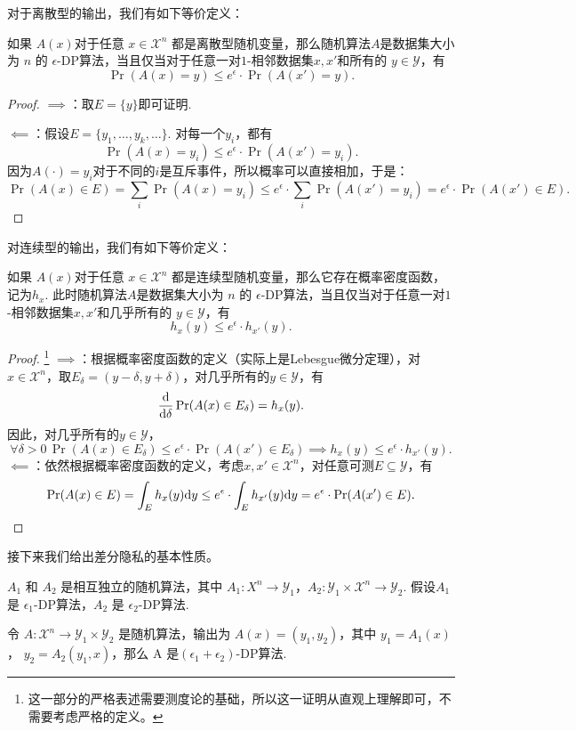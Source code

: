 对于离散型的输出，我们有如下等价定义：
\begin{proposition}\label{prop:discrete-dp}
    如果 $A(x)$对于任意 $x \in \mathcal X^n$ 都是离散型随机变量，那么随机算法$A$是数据集大小为 $n$ 的 $\epsilon$-DP算法，当且仅当对于任意一对$1$-相邻数据集$x, x'$和所有的 $y \in \mathcal Y$，有
    \[
    \Pr(A(x) = y) \leq e^{\epsilon} \cdot \Pr(A(x') = y).
    \]
\end{proposition}
\begin{proof}
$\implies$：取$E = \{y\}$即可证明.

$\impliedby$：假设$E=\{y_1,\dots,y_k,\dots\}$. 对每一个$y_i$，都有
    \[
    \Pr(A(x) = y_i) \leq e^{\epsilon} \cdot \Pr(A(x') = y_i).
    \]
因为$A(\cdot)=y_i$对于不同的$i$是互斥事件，所以概率可以直接相加，于是：
    \[
    \Pr(A(x) \in E) = \sum_i \Pr(A(x) = y_i) \leq e^{\epsilon} \cdot \sum_i\Pr(A(x') = y_i) = e^{\epsilon} \cdot \Pr(A(x') \in E).
    \]
\end{proof}

对连续型的输出，我们有如下等价定义：
\begin{proposition}\label{prop:continuous-dp}
如果 $A(x)$对于任意 $x \in \mathcal X^n$ 都是连续型随机变量，那么它存在概率密度函数，记为$h_{x}$. 此时随机算法$A$是数据集大小为 $n$ 的 $\epsilon$-DP算法，当且仅当对于任意一对$1$-相邻数据集$x, x'$和几乎所有的 $y \in \mathcal Y$，有
    \[
    h_{x}(y) \leq e^{\epsilon} \cdot h_{x'}(y).
    \]
\end{proposition}
\begin{proof}\footnote{这一部分的严格表述需要测度论的基础，所以这一证明从直观上理解即可，不需要考虑严格的定义。}
$\implies$：根据概率密度函数的定义（实际上是Lebesgue微分定理），对$x\in\mathcal X^n$，取$E_\delta = (y-\delta, y+\delta)$，对几乎所有的$y\in\mathcal Y$，有
\[\frac{\mathrm{d}}{\mathrm{d}\delta}\Pr(A(x)\in E_\delta)=h_x(y).\]
因此，对几乎所有的$y\in\mathcal Y$，
\[\forall\delta>0\,\Pr(A(x)\in E_\delta) \leq e^{\epsilon} \cdot \Pr(A(x')\in E_\delta)\implies h_x(y)\leq e^\epsilon\cdot h_{x'}(y).\]
$\impliedby$：依然根据概率密度函数的定义，考虑$x,x'\in\mathcal X^n$，对任意可测$E\subseteq\mathcal Y$，有
\[\Pr(A(x)\in E)=\int_E h_x(y)\mathrm{d} y\leq e^\epsilon\cdot\int_E h_{x'}(y)\mathrm{d} y=e^\epsilon\cdot\Pr(A(x')\in E).\]
\end{proof}

接下来我们给出差分隐私的基本性质。

\begin{proposition}\label{prop:composition}
    $A_1$ 和 $A_2$ 是相互独立的随机算法，其中 $A_1 : X^n \to \mathcal Y_1$，$A_2 : \mathcal Y_1 \times \mathcal X^n \to \mathcal Y_2$. 假设$A_1$是 $\epsilon_1$-DP算法，$A_2$ 是 $\epsilon_2$-DP算法.
    
    令 $A :\mathcal X^n \to \mathcal Y_1 \times \mathcal Y_2$ 是随机算法，输出为 $A(x) = (y_1, y_2)$，其中 $y_1 = A_1(x)$， $y_2 = A_2(y_1, x)$，那么 A 是$(\epsilon_1 + \epsilon_2)$-DP算法.
\end{proposition}

